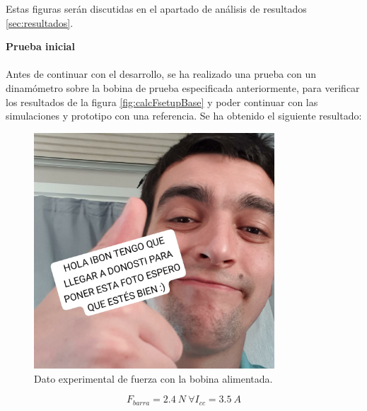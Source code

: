 Estas figuras serán discutidas en el apartado de análisis de resultados \ref{sec:resultados}.

\noindent \textbf{Prueba inicial}
\\~\\
\indent Antes de continuar con el desarrollo, se ha realizado una prueba con un dinamómetro sobre la bobina de prueba especificada anteriormente, para verificar los resultados de la figura \ref{fig:calcFsetupBase} y poder continuar con las simulaciones y prototipo con una referencia. Se ha obtenido el siguiente resultado:

\begin{figure}[H]
    \centering
    \includegraphics[width=9cm]{FigurasMemoria/dinamometro.jpeg}
    \caption{Dato experimental de fuerza con la bobina alimentada.}
    \label{fig:dinamometro} %
\end{figure}

\[F_{barra}=2.4~N~\forall I_{cc}=3.5~A\]